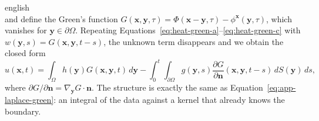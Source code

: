 \documentclass[0000.tex]{subfiles}
\begin{document}
\begin{hyphenrules}{english}
\begin{equation}
  \label{eq:heat-corrector}
\end{equation}
and define the Green's function $G(\mathbf{x},\mathbf{y},\tau)=\Phi(\mathbf{x}-\mathbf{y},\tau)-\phi^{\mathbf{x}}(\mathbf{y},\tau)$, which vanishes for
$\mathbf{y}\in\partial\Omega$. Repeating Equations~\eqref{eq:heat-green-a}--\eqref{eq:heat-green-c} with
$w(\mathbf{y},s)=G(\mathbf{x},\mathbf{y},t-s)$, the unknown term disappears and we obtain the closed form
\begin{equation}
  u(\mathbf{x},t)=\int_\Omega h(\mathbf{y})G(\mathbf{x},\mathbf{y},t)\,d\mathbf{y}
  -\int_0^t\!\!\int_{\partial\Omega}g(\mathbf{y},s)\frac{\partial G}{\partial\mathbf{n}}(\mathbf{x},\mathbf{y},t-s)\,d S(\mathbf{y})\,d s,
  \label{eq:app-heat-green}
\end{equation}
where $\partial G/\partial\mathbf{n}=\nabla_{\mathbf{y}}G\cdot\mathbf{n}$. The structure is exactly the same as
Equation~\eqref{eq:app-laplace-green}: an integral of the data against a kernel that already knows the boundary.


\end{hyphenrules}
\end{document}
